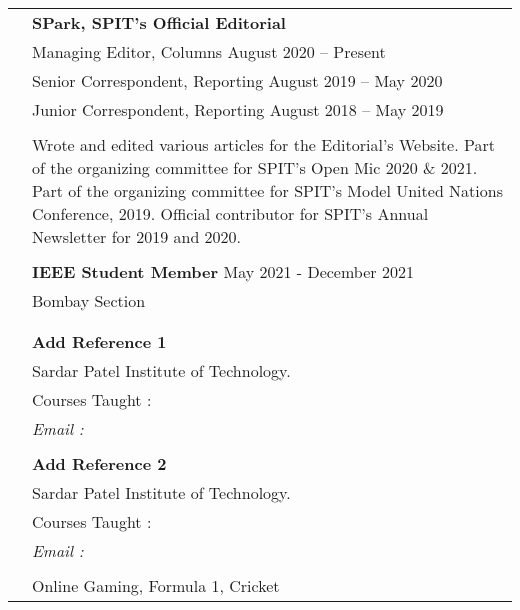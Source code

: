 \documentclass[letterpaper, 11pt]{article}
\begin{document}
\begin{longtable}{p{1.3in}p{4.8in}}
{\color{OliveGreen}{Professional}} 
& {\textbf{SPark, SPIT’s Official Editorial}} \hfill \\
{\color{OliveGreen}{memberships}} 
& Managing Editor, Columns \hfill August 2020 – Present \\
& Senior Correspondent, Reporting \hfill August 2019 – May 2020\\
& Junior Correspondent, Reporting \hfill August 2018 – May 2019 \\
& \\
& Wrote and edited various articles for the Editorial’s Website. Part of the organizing committee for SPIT’s Open Mic 2020 \& 2021. Part of the organizing committee for SPIT’s Model United Nations Conference, 2019. Official contributor for SPIT’s Annual Newsletter for 2019 and 2020.\\
\\

& {\textbf{IEEE Student Member}} \hfill May 2021 - December 2021\\
& Bombay Section\\
& \\
\\

\nohyphens{\color{OliveGreen}{References}} 
& \textbf{Add Reference 1} \\
& Sardar Patel Institute of Technology. \\
& Courses Taught : \\
& \textit{Email : }\\
& \\

& \textbf{Add Reference 2} \\
& Sardar Patel Institute of Technology. \\
& Courses Taught : \\
& \textit{Email : }\\
& \\



\nohyphens{\color{OliveGreen}{Other interests}} & Online Gaming, Formula 1, Cricket\\


\end{longtable}
\end{document}
